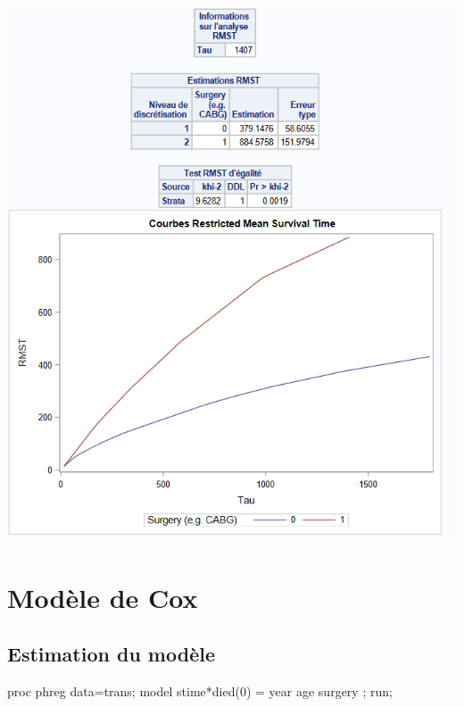 \documentclass[
  12pt,
  letterpaper,
  DIV=11,
  numbers=noendperiod,
  onepage,
  openany]{scrreprt}
\newenvironment{Shaded}{\begin{snugshade}}{\end{snugshade}}
\newcommand{\DecValTok}[1]{\textcolor[rgb]{0.86,0.86,0.80}{#1}}
\newcommand{\FunctionTok}[1]{\textcolor[rgb]{0.94,0.94,0.56}{#1}}
\newcommand{\NormalTok}[1]{\textcolor[rgb]{0.80,0.80,0.80}{#1}}
\newcommand{\OtherTok}[1]{\textcolor[rgb]{0.94,0.94,0.56}{#1}}
\newcommand{\SpecialCharTok}[1]{\textcolor[rgb]{0.86,0.64,0.64}{#1}}
\begin{document}
\includegraphics{sas/4.PNG}

\hypertarget{moduxe8le-de-cox-3}{%
\section{Modèle de Cox}\label{moduxe8le-de-cox-3}}

\hypertarget{estimation-du-moduxe8le-2}{%
\subsection{Estimation du modèle}\label{estimation-du-moduxe8le-2}}

\begin{Shaded}
\begin{Highlighting}[]
\NormalTok{proc phreg data}\OtherTok{=}\NormalTok{trans;}
\NormalTok{model stime}\SpecialCharTok{*}\FunctionTok{died}\NormalTok{(}\DecValTok{0}\NormalTok{) }\OtherTok{=}\NormalTok{ year age surgery ;}
\NormalTok{run;}
\end{Highlighting}
\end{Shaded}
\end{document}
